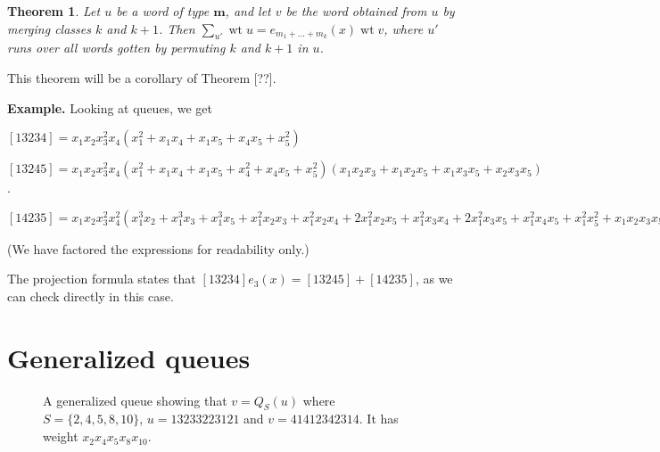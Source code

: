\documentclass[reqno]{amsart}
\newcommand{\mbf}{\mathbf}
\DeclareMathOperator{\wt}{wt} %
\let\sumnonlimits\sum
\renewcommand{\sum}{\sumnonlimits\limits}
\theoremstyle{plain}
\newtheorem{thm}{Theorem}[section]
\theoremstyle{definition}
\numberwithin{equation}{section}
\begin{document}
\begin{thm}
  Let $u$ be a word of type $\mbf{m}$, and let $v$ be the word obtained from $u$ by merging classes $k$ and $k+1$.
  Then $\sum_{u'} \wt{u} = e_{m_1+\dots+m_k}(x) \wt{v}$,
  where $u'$ runs over all words gotten by permuting $k$ and $k+1$ in $u$.
\end{thm}

This theorem will be a corollary of Theorem [??].


\noindent
{\bf Example.}
Looking at queues, we get \\
\noindent

$[13234] = x_1x_2x_3^2x_4(x_1^2+x_1x_4+x_1x_5+x_4x_5+x_5^2)$

$[13245] = x_1x_2x_3^2x_4(x_1^2+x_1x_4+x_1x_5+x_4^2+x_4x_5+x_5^2)(x_1x_2x_3+x_1x_2x_5+x_1x_3x_5+x_2x_3x_5)$.

$[14235] = x_1x_2x_3^2x_4^2(x_1^3x_2+x_1^3x_3+x_1^3x_5+x_1^2x_2x_3+x_1^2x_2x_4+2x_1^2x_2x_5+x_1^2x_3x_4+2x_1^2x_3x_5+x_1^2x_4x_5+x_1^2x_5^2+x_1x_2x_3x_5+x_1x_2x_4x_5+2x_1x_2x_5^2+x_1x_3x_4x_5+2x_1x_3x_5^2+x_1x_4x_5^2+x_1x_5^3+x_2x_3x_5^2+x_2x_4x_5^2+x_2x_5^3+x_3x_4x_5^2+x_3x_5^3)
$

(We have factored the expressions for readability only.)

The projection formula states that $[13234] e_3(x) = [13245] + [14235]$, as we can check directly in this case.


\section{Generalized queues}

\begin{figure}
\label{fig_generalized_queue}
\caption{A generalized queue showing that $v = Q_S(u)$ where $S = \{2,4,5,8,10\}$, $u = 13233223121$ and $v =41412342314$. It has weight $x_2x_4x_5x_8x_{10}$.}
\end{figure}
\end{document}
